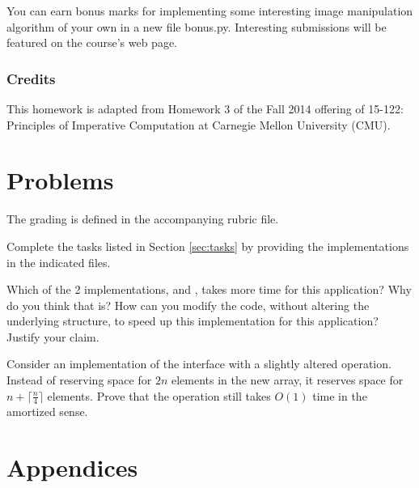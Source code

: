 \documentclass[addpoints]{exam}
\begin{document}
  You can earn bonus marks for implementing some interesting image manipulation algorithm of your own in a new file  \textsf{bonus.py}. Interesting submissions will be featured on the course's web page.

  \section{Credits}

  This homework is adapted from Homework 3 of the Fall 2014 offering of 15-122: Principles of Imperative Computation at Carnegie Mellon University (CMU).


\part{Problems}

  The grading is defined in the accompanying rubric file.
  \begin{questions}
   Complete the tasks listed in Section \ref{sec:tasks} by providing the implementations in the indicated files.
    
   Which of the 2 implementations,  and , takes more time for this application? Why do you think that is? How can you modify the code, without altering the underlying structure, to speed up this implementation for this application? Justify your claim.
    \begin{solution}
      
    \end{solution}

    Consider an  implementation of the  interface with a slightly altered  operation. Instead of reserving space for $2n$ elements in the new array, it reserves space for $n + \lceil \frac{n}{4} \rceil$ elements. Prove that the  operation still takes $O(1)$ time in the amortized sense.
    \begin{solution}
      
    \end{solution}
    
  \end{questions}

  \newpage
\part{Appendices}
\end{document}

